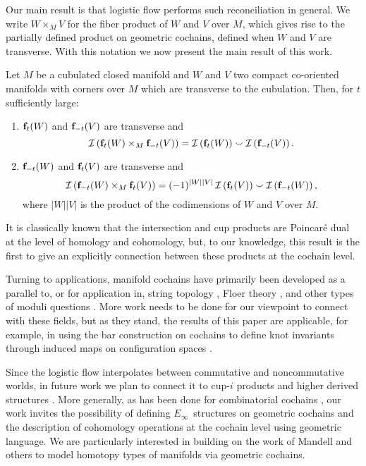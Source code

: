 Our main result is that logistic flow performs such reconciliation in general.
We write $W \times_MV$ for the fiber product of $W$ and $V$ over $M$, which gives rise to the partially defined product on geometric cochains,
defined when $W$ and $V$ are transverse.
With this notation we now present the main result of this work.
 
\begin{theorem} \label{T:main1}
	Let $M$ be a cubulated closed manifold and $W$ and $V$ two compact co-oriented manifolds with corners over $M$ which are transverse to the cubulation. Then, for $t$ sufficiently large:
	\begin{enumerate}
		\item $\mathbf{f}_t(W)$ and $\mathbf{f}_{-t}(V)$ are transverse and
		\begin{equation*}
		\mathcal{I}\left(\mathbf{f}_t(W) \times_M \mathbf{f}_{-t}(V)\right) = \mathcal{I}\left(\mathbf{f}_t(W)\right) \smallsmile \mathcal{I}\left(\mathbf{f}_{-t}(V)\right).
		\end{equation*}
		\item $\mathbf{f}_{-t}(W)$ and $\mathbf{f}_t(V)$ are transverse and
		\begin{equation*}
		\mathcal{I}\left(\mathbf{f}_{-t}(W) \times_M \mathbf{f}_t(V)\right) = (-1)^{|W||V|} \, \mathcal{I}\left(\mathbf{f}_t(V)\right) \smallsmile \mathcal{I}\left(\mathbf{f}_{-t}(W)\right),
		\end{equation*}
		where $|W||V|$ is the product of the codimensions of $W$ and $V$ over $M$.
	\end{enumerate}
\end{theorem}

It is classically known that the intersection and cup products are Poincar\'e dual at the level of homology and cohomology, but, to our knowledge, this result is the first to give an explicitly connection between these products at the cochain level. 

Turning to applications, manifold cochains have primarily been developed as a parallel to, or for application in, string topology \cite{chas1999string}, Floer theory \cite{Lipy08}, and other types of moduli questions \cite{BoJo17}.
More work needs to be done for our viewpoint to connect with these  fields, but as they stand, the results of this paper are applicable, for example, in using the bar construction on cochains to define knot invariants through induced maps on configuration spaces \cite{BCSS05, SiWa13, BCKS17}. 

Since the logistic flow interpolates between commutative and noncommutative worlds, in future work we plan to connect it to cup-$i$ products \cite{steenrod1947cocycles, medina2018axiomatic} and higher derived structures \cite{medina2020cartan, medina2020adem}.
More generally, as has been done for combinatorial cochains \cite{mcclure2003multivariate, berger2004combinatorial, medina2020prop1, medina2021cubical}, our work invites the possibility of defining \mbox{$E_\infty$ structures} on geometric cochains and the description of cohomology operations at the cochain level \cite{medina2020odd} using geometric language.
We are particularly interested in building on the work of Mandell \cite{Mand01} and others to model homotopy types of manifolds via geometric cochains.

